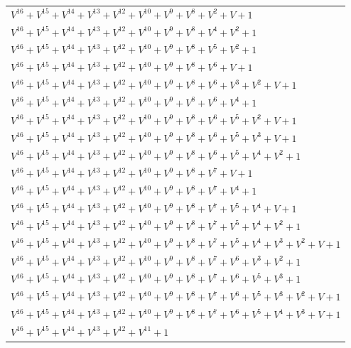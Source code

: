 \documentclass[12pt]{article}
\begin{document}
\begin{adjustwidth}{-4cm}{}
\begin{center}
\begin{longtable}{|l|}
$V^{16}  +V^{15}  +V^{14}  +V^{13}  +V^{12}  +V^{10}  +V^{9}  +V^{8}  +V^{2}  + V + 1$ \\
$V^{16}  +V^{15}  +V^{14}  +V^{13}  +V^{12}  +V^{10}  +V^{9}  +V^{8}  +V^{4}  +V^{2}  + 1$ \\
$V^{16}  +V^{15}  +V^{14}  +V^{13}  +V^{12}  +V^{10}  +V^{9}  +V^{8}  +V^{5}  +V^{2}  + 1$ \\
$V^{16}  +V^{15}  +V^{14}  +V^{13}  +V^{12}  +V^{10}  +V^{9}  +V^{8}  +V^{6}  + V + 1$ \\
$V^{16}  +V^{15}  +V^{14}  +V^{13}  +V^{12}  +V^{10}  +V^{9}  +V^{8}  +V^{6}  +V^{3}  +V^{2}  + V + 1$ \\
$V^{16}  +V^{15}  +V^{14}  +V^{13}  +V^{12}  +V^{10}  +V^{9}  +V^{8}  +V^{6}  +V^{4}  + 1$ \\
$V^{16}  +V^{15}  +V^{14}  +V^{13}  +V^{12}  +V^{10}  +V^{9}  +V^{8}  +V^{6}  +V^{5}  +V^{2}  + V + 1$ \\
$V^{16}  +V^{15}  +V^{14}  +V^{13}  +V^{12}  +V^{10}  +V^{9}  +V^{8}  +V^{6}  +V^{5}  +V^{3}  + V + 1$ \\
$V^{16}  +V^{15}  +V^{14}  +V^{13}  +V^{12}  +V^{10}  +V^{9}  +V^{8}  +V^{6}  +V^{5}  +V^{4}  +V^{2}  + 1$ \\
$V^{16}  +V^{15}  +V^{14}  +V^{13}  +V^{12}  +V^{10}  +V^{9}  +V^{8}  +V^{7}  + V + 1$ \\
$V^{16}  +V^{15}  +V^{14}  +V^{13}  +V^{12}  +V^{10}  +V^{9}  +V^{8}  +V^{7}  +V^{4}  + 1$ \\
$V^{16}  +V^{15}  +V^{14}  +V^{13}  +V^{12}  +V^{10}  +V^{9}  +V^{8}  +V^{7}  +V^{5}  +V^{4}  + V + 1$ \\
$V^{16}  +V^{15}  +V^{14}  +V^{13}  +V^{12}  +V^{10}  +V^{9}  +V^{8}  +V^{7}  +V^{5}  +V^{4}  +V^{2}  + 1$ \\
$V^{16}  +V^{15}  +V^{14}  +V^{13}  +V^{12}  +V^{10}  +V^{9}  +V^{8}  +V^{7}  +V^{5}  +V^{4}  +V^{3}  +V^{2}  + V + 1$ \\
$V^{16}  +V^{15}  +V^{14}  +V^{13}  +V^{12}  +V^{10}  +V^{9}  +V^{8}  +V^{7}  +V^{6}  +V^{3}  +V^{2}  + 1$ \\
$V^{16}  +V^{15}  +V^{14}  +V^{13}  +V^{12}  +V^{10}  +V^{9}  +V^{8}  +V^{7}  +V^{6}  +V^{5}  +V^{3}  + 1$ \\
$V^{16}  +V^{15}  +V^{14}  +V^{13}  +V^{12}  +V^{10}  +V^{9}  +V^{8}  +V^{7}  +V^{6}  +V^{5}  +V^{3}  +V^{2}  + V + 1$ \\
$V^{16}  +V^{15}  +V^{14}  +V^{13}  +V^{12}  +V^{10}  +V^{9}  +V^{8}  +V^{7}  +V^{6}  +V^{5}  +V^{4}  +V^{3}  + V + 1$ \\
$V^{16}  +V^{15}  +V^{14}  +V^{13}  +V^{12}  +V^{11}  + 1$ \\

\end{longtable}
\end{center}
\end{adjustwidth}
\end{document}
